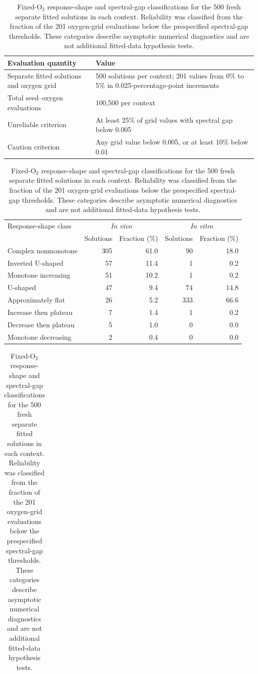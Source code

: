 \begin{table}[!htbp]
\centering
\scriptsize
\setlength{\tabcolsep}{4pt}
\caption{Fixed-O$_2$ response-shape and spectral-gap classifications for the 500 fresh separate fitted solutions in each context. Reliability was classified from the fraction of the 201 oxygen-grid evaluations below the prespecified spectral-gap thresholds. These categories describe asymptotic numerical diagnostics and are not additional fitted-data hypothesis tests.}
\label{tab:fixed_o2_separate_summary}
\begin{tabular}{@{}p{}p{}@{}}
\toprule
Evaluation quantity & Value \\
\midrule
Separate fitted solutions and oxygen grid & 500 solutions per context; 201 values from 0\% to 5\% in 0.025-percentage-point increments \\
Total seed--oxygen evaluations & 100,500 per context \\
Unreliable criterion & At least 25\% of grid values with spectral gap below 0.005 \\
Caution criterion & Any grid value below 0.005, or at least 10\% below 0.01 \\
\bottomrule
\end{tabular}
\vspace{0.8em}
\begin{tabular}{@{}lrrrr@{}}
\toprule
Response-shape class & \multicolumn{2}{c}{\textit{In vivo}} & \multicolumn{2}{c}{\textit{In vitro}} \\
 & Solutions & Fraction (\%) & Solutions & Fraction (\%) \\
\midrule
Complex nonmonotone & 305 & 61.0 & 90 & 18.0 \\
Inverted U-shaped & 57 & 11.4 & 1 & 0.2 \\
Monotone increasing & 51 & 10.2 & 1 & 0.2 \\
U-shaped & 47 & 9.4 & 74 & 14.8 \\
Approximately flat & 26 & 5.2 & 333 & 66.6 \\
Increase then plateau & 7 & 1.4 & 1 & 0.2 \\
Decrease then plateau & 5 & 1.0 & 0 & 0.0 \\
Monotone decreasing & 2 & 0.4 & 0 & 0.0 \\
\bottomrule
\end{tabular}
\hspace{1.2em}
\begin{tabular}{@{}lrrrr@{}}
\toprule

\end{tabular}
\end{table}
